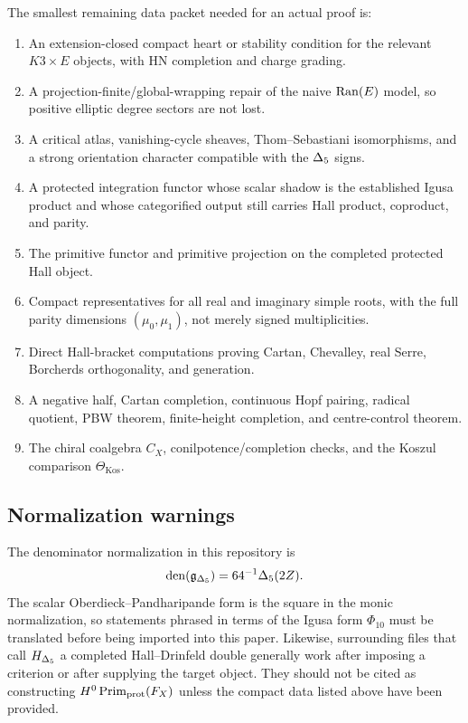 The smallest remaining data packet needed for an actual proof is:
\begin{enumerate}
\item An extension-closed compact heart or stability condition for the
relevant \(K3\times E\) objects, with HN completion and charge grading.
\item A projection-finite/global-wrapping repair of the naive \(\operatorname{Ran}(E)\)
model, so positive elliptic degree sectors are not lost.
\item A critical atlas, vanishing-cycle sheaves, Thom--Sebastiani
isomorphisms, and a strong orientation character compatible with the
\(\Delta_{5}\) signs.
\item A protected integration functor whose scalar shadow is the established
Igusa product and whose categorified output still carries Hall product,
coproduct, and parity.
\item The primitive functor and primitive projection on the completed
protected Hall object.
\item Compact representatives for all real and imaginary simple roots, with
the full parity dimensions \((\mu_0,\mu_1)\), not merely signed
multiplicities.
\item Direct Hall-bracket computations proving Cartan, Chevalley, real Serre,
Borcherds orthogonality, and generation.
\item A negative half, Cartan completion, continuous Hopf pairing, radical
quotient, PBW theorem, finite-height completion, and centre-control theorem.
\item The chiral coalgebra \(C_X\), conilpotence/completion checks, and the
Koszul comparison \(\Theta_{\operatorname{Kos}}\).
\end{enumerate}

\subsection{Normalization warnings}

The denominator normalization in this repository is
\[
   \operatorname{den}(\mathfrak g_{\Delta_{5}})=64^{-1}\Delta_{5}(2Z).
\]
The scalar Oberdieck--Pandharipande form is the square in the monic
normalization, so statements phrased in terms of the Igusa form
\(\Phi_{10}\) must be translated before being imported into this paper.
Likewise, surrounding files that call \(H_{\Delta_{5}}\) a completed
Hall--Drinfeld double generally work after imposing a criterion or after
supplying the target object.  They should not be cited as constructing
\(H^0\operatorname{Prim}_{\mathrm{prot}}(F_X)\) unless the compact data listed above have been
provided.


